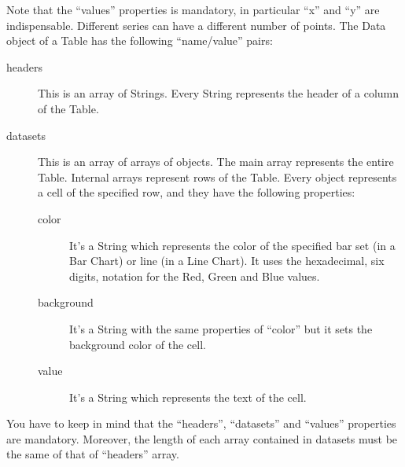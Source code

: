 				Note that the “values” properties is mandatory, in particular “x” and “y” are indispensable. Different series can have a different number of points.
				The Data object of a Table has the following “name/value” pairs:
				\begin{description}
					\item[headers] This is an array of Strings. Every String represents the header of a column of the Table.
					\item[datasets] This is an array of arrays of objects. The main array represents the entire Table. Internal arrays represent rows of the Table. Every object represents a cell of the specified row, and they have the following properties:
					\begin{description}
						\item[color] It's a String which represents the color of the specified bar set (in a Bar Chart) or line (in a Line Chart). It uses the hexadecimal, six digits, notation for the Red, Green and Blue values. 
						\item[background] It's a String with the same properties of “color” but it sets the background color of the cell.
						\item[value] It's a String which represents the text of the cell.
					\end{description}
				\end{description}
				You have to keep in mind that the “headers”, “datasets” and “values” properties are mandatory. Moreover, the length of each array contained in datasets must be the same of that of “headers” array.

